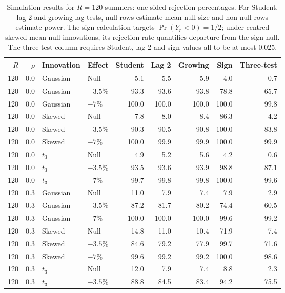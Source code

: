 \begin{table}[H]
\centering
\normalsize\renewcommand{\arraystretch}{1.55}\setlength{\tabcolsep}{4pt}
\caption{Simulation results for $R=120$ summers: one-sided rejection percentages. For Student, lag-2 and growing-lag tests, null rows estimate mean-null size and non-null rows estimate power. The sign calculation targets $\Pr(Y_r<0)=1/2$; under centred skewed mean-null innovations, its rejection rate quantifies departure from the sign null. The three-test column requires Student, lag-2 and sign values all to be at most 0.025.}
\label{tab:year-simulation-complete-c-r120}
\begin{tabular*}{\textwidth}{@{\extracolsep{\fill}}rrllrrrrr}
\toprule
$R$ & $\rho$ & Innovation & Effect & Student & Lag 2 & Growing & Sign & Three-test \\
\midrule
120 & 0.0 & Gaussian & Null & 5.1 & 5.5 & 5.9 & 4.0 & 0.7 \\
120 & 0.0 & Gaussian & $-3.5\%$ & 93.3 & 93.6 & 93.8 & 78.8 & 65.7 \\
120 & 0.0 & Gaussian & $-7\%$ & 100.0 & 100.0 & 100.0 & 100.0 & 99.8 \\
120 & 0.0 & Skewed & Null & 7.8 & 8.0 & 8.4 & 86.3 & 4.2 \\
120 & 0.0 & Skewed & $-3.5\%$ & 90.3 & 90.5 & 90.8 & 100.0 & 83.8 \\
120 & 0.0 & Skewed & $-7\%$ & 100.0 & 99.9 & 99.9 & 100.0 & 99.9 \\
120 & 0.0 & $t_3$ & Null & 4.9 & 5.2 & 5.6 & 4.2 & 0.6 \\
120 & 0.0 & $t_3$ & $-3.5\%$ & 93.5 & 93.6 & 93.9 & 98.8 & 87.1 \\
120 & 0.0 & $t_3$ & $-7\%$ & 99.7 & 99.8 & 99.8 & 100.0 & 99.6 \\
120 & 0.3 & Gaussian & Null & 11.0 & 7.9 & 7.4 & 7.9 & 2.9 \\
120 & 0.3 & Gaussian & $-3.5\%$ & 87.2 & 81.7 & 80.2 & 74.4 & 60.5 \\
120 & 0.3 & Gaussian & $-7\%$ & 100.0 & 100.0 & 100.0 & 99.6 & 99.2 \\
120 & 0.3 & Skewed & Null & 14.8 & 11.0 & 10.4 & 71.9 & 7.4 \\
120 & 0.3 & Skewed & $-3.5\%$ & 84.6 & 79.2 & 77.9 & 99.7 & 71.6 \\
120 & 0.3 & Skewed & $-7\%$ & 99.6 & 99.2 & 99.2 & 100.0 & 98.6 \\
120 & 0.3 & $t_3$ & Null & 12.0 & 7.9 & 7.4 & 8.8 & 2.3 \\
120 & 0.3 & $t_3$ & $-3.5\%$ & 88.8 & 84.5 & 83.4 & 94.2 & 75.5 \\

\end{tabular*}
\end{table}
